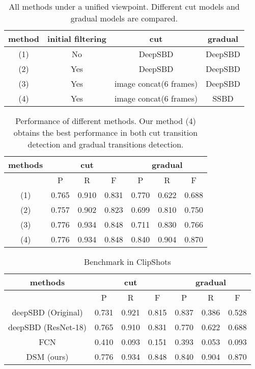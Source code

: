 \documentclass[runningheads]{llncs}
\begin{document}
\begin{table}
\centering
\begin{tabular} {c|c|c|c}
\hline method&initial filtering&cut&gradual\\
\hline (1)&No&DeepSBD&DeepSBD\\
\hline (2)&Yes&DeepSBD&DeepSBD\\
\hline (3)&Yes&image concat(6 frames)&DeepSBD\\
\hline (4)&Yes&image concat(6 frames)&SSBD\\
\hline 
\end{tabular}
\caption[general comparison]{All methods under a unified viewpoint. Different cut models and gradual models are compared.}\label{table:8}
\end{table}
\vspace{-5em}
\begin{table}
\centering
\small
\begin{tabular} {c|c|c|c|c|c|c}
\hline \multicolumn{1}{c|}{methods}&\multicolumn{3}{|c|}{cut}&\multicolumn{3}{|c}{gradual}\\
\hline &P&R&F&P&R&F\\
\hline (1)&0.765&0.910&0.831&0.770&0.622&0.688\\
\hline (2)&0.757&0.902&0.823&0.699&0.810&0.750\\
\hline (3)&0.776&0.934&0.848&0.711&0.830&0.766\\
\hline (4)&0.776&0.934&0.848&0.840&0.904&0.870\\
\hline 
\end{tabular}
\caption[general comparison]{Performance of different methods. Our method (4) obtains the best performance in both cut transition detection and gradual transitions detection.}\label{table:2}
\end{table}
\vspace{-2em}
\begin{table}
\centering
\begin{tabular} {c|c|c|c|c|c|c}
\hline \multicolumn{1}{c|}{methods}&\multicolumn{3}{|c|}{cut}&\multicolumn{3}{|c}{gradual}\\
\hline &P&R&F&P&R&F\\
\hline deepSBD (Original)&0.731&0.921&0.815&0.837&0.386&0.528\\
\hline deepSBD (ResNet-18)&0.765&0.910&0.831&0.770&0.622&0.688\\
\hline FCN\cite{gygli2017ridiculously}&0.410&0.093&0.151&0.393&0.053&0.093\\
\hline DSM (ours)&0.776&0.934&0.848&0.840&0.904&0.870\\
\hline 
\end{tabular}
\caption[general comparison]{Benchmark in ClipShots}\label{table:5}
\end{table}
\end{document}
